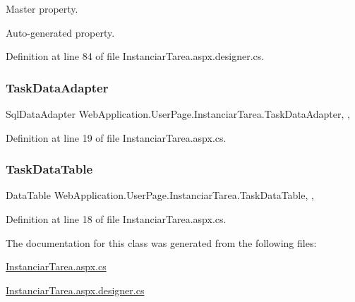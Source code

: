Master property. 

Auto-\/generated property. 

Definition at line 84 of file Instanciar\+Tarea.\+aspx.\+designer.\+cs.

\mbox{\label{classWebApplication_1_1UserPage_1_1InstanciarTarea_a3fadf343ca9a543ed48897c69c7253a4}} 
\subsubsection{\texorpdfstring{TaskDataAdapter}{TaskDataAdapter}}
{\footnotesize\ttfamily Sql\+Data\+Adapter Web\+Application.\+User\+Page.\+Instanciar\+Tarea.\+Task\+Data\+Adapter\hspace{0.3cm}{\ttfamily [get]}, {\ttfamily [set]}, {\ttfamily [private]}}



Definition at line 19 of file Instanciar\+Tarea.\+aspx.\+cs.

\mbox{\label{classWebApplication_1_1UserPage_1_1InstanciarTarea_a079c2ac82dc950ae13a0ba75b015f9b7}} 
\subsubsection{\texorpdfstring{TaskDataTable}{TaskDataTable}}
{\footnotesize\ttfamily Data\+Table Web\+Application.\+User\+Page.\+Instanciar\+Tarea.\+Task\+Data\+Table\hspace{0.3cm}{\ttfamily [get]}, {\ttfamily [set]}, {\ttfamily [private]}}



Definition at line 18 of file Instanciar\+Tarea.\+aspx.\+cs.



The documentation for this class was generated from the following files\+:\begin{DoxyCompactItemize}
\item 
\mbox{\hyperlink{InstanciarTarea_8aspx_8cs}{Instanciar\+Tarea.\+aspx.\+cs}}\item 
\mbox{\hyperlink{InstanciarTarea_8aspx_8designer_8cs}{Instanciar\+Tarea.\+aspx.\+designer.\+cs}}\end{DoxyCompactItemize}

